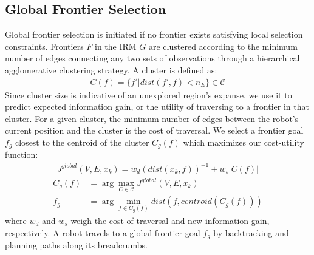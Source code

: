 \documentclass[letterpaper, 10pt, conference]{ieeeconf}      %
\begin{document}
\subsection{Global Frontier Selection}
Global frontier selection is initiated if no frontier exists satisfying local selection constraints. Frontiers $F$ in the IRM $G$ are clustered according to the minimum number of edges connecting any two sets of observations through a hierarchical agglomerative clustering strategy. A cluster is defined as:
\begin{align}
    C(f) = \{ f' | dist(f', f) < n_{E} \}\in\mathcal{C} 
\end{align}
Since cluster size is indicative of an unexplored region's expanse, we use it to predict expected information gain, or the utility of traversing to a frontier in that cluster. For a given cluster, the minimum number of edges between the robot's current position and the cluster is the cost of traversal. We select a frontier goal $f_g$ closest to the centroid of the cluster $C_g(f)$ which maximizes our cost-utility function:
\begin{align}
    J^{global}(V, E, x_k) = w_{d}(dist(x_k, f))^{-1} + w_{s}|C(f)|
\end{align}
\begin{align}
    C_g(f) &= \arg\max_{C\in \mathcal{C}} J^{global}(V, E, x_k) \\
    f_g &= \arg\min_{f\in C_g(f)} dist(f, centroid(C_g(f)))
\end{align}
where $w_d$ and $w_s$ weigh the cost of traversal and new information gain, respectively. 
A robot travels to a global frontier goal $f_g$ by backtracking and planning paths along its breadcrumbs.

\end{document}
